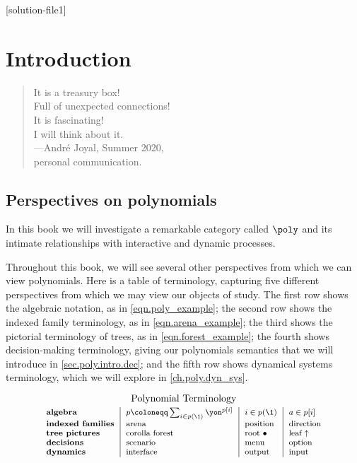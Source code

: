 [solution-file1]

\chapter{Introduction}\label{ch.poly.intro}

\begin{quote}
    It is a treasury box!\\
    Full of unexpected connections!\\
    It is fascinating!\\
    I will think about it.\\
    \mbox{}\hfill ---Andr\'e Joyal, Summer 2020,\\
    \mbox{}\hfill personal communication.
\end{quote}

\section{Perspectives on polynomials}

In this book we will investigate a remarkable category called $\poly$ and its intimate relationships with interactive and dynamic processes.


Throughout this book, we will see several other perspectives from which we can view polynomials.
Here is a table of terminology, capturing five different perspectives from which we may view our objects of study.
The first row shows the algebraic notation, as in \eqref{eqn.poly_example};
the second row shows the indexed family terminology, as in \eqref{eqn.arena_example};
the third shows the pictorial terminology of trees, as in \eqref{eqn.forest_example}; the fourth shows decision-making terminology, giving our polynomials semantics that we will introduce in \cref{sec.poly.intro.dec}; and the fifth row shows dynamical systems terminology, which we will explore in \cref{ch.poly.dyn_sys}.

\begin{equation}%
    \footnotesize
    \begin{tabular}{l|l|l|l}
        \multicolumn{4}{c}{\normalsize Polynomial Terminology}\\[3pt]
        \textbf{algebra} & $p \coloneqq \sum_{i \in p(\1)} \yon^{p[i]}$ & $i \in p(\1)$ & $a \in p[i]$ \\
        \textbf{indexed families} & arena & position & direction \\
        \textbf{tree pictures} & corolla forest & root $\bullet$ & leaf $\uparrow$ \\
        \textbf{decisions} & scenario & menu & option \\
        \textbf{dynamics} & interface & output & input
    \end{tabular}
\end{equation}

